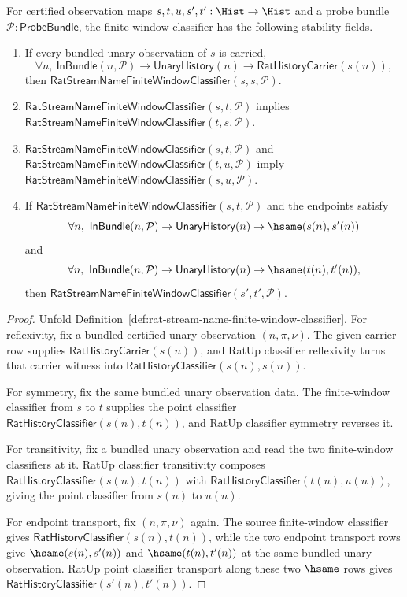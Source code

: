 \begin{theorem}
\label{thm:rat-stream-name-finite-window-stability-fields}
For certified observation maps $s,t,u,s',t':\Hist\to\Hist$ and a probe bundle
$\mathcal{P}:\mathsf{ProbeBundle}$, the finite-window classifier has the
following stability fields.
\begin{enumerate}
  \item If every bundled unary observation of $s$ is carried,
  $$
  \forall n,\ \mathsf{InBundle}(n,\mathcal{P})\to
  \mathsf{UnaryHistory}(n)\to\mathsf{RatHistoryCarrier}(s(n)),
  $$
  then $\mathsf{RatStreamNameFiniteWindowClassifier}(s,s,\mathcal{P})$.
  \item $\mathsf{RatStreamNameFiniteWindowClassifier}(s,t,\mathcal{P})$
  implies
  $\mathsf{RatStreamNameFiniteWindowClassifier}(t,s,\mathcal{P})$.
  \item $\mathsf{RatStreamNameFiniteWindowClassifier}(s,t,\mathcal{P})$ and
  $\mathsf{RatStreamNameFiniteWindowClassifier}(t,u,\mathcal{P})$ imply
  $\mathsf{RatStreamNameFiniteWindowClassifier}(s,u,\mathcal{P})$.
  \item If $\mathsf{RatStreamNameFiniteWindowClassifier}(s,t,\mathcal{P})$
  and the endpoints satisfy
  $$
  \forall n,\ \mathsf{InBundle}(n,\mathcal{P})\to
  \mathsf{UnaryHistory}(n)\to\hsame(s(n),s'(n))
  $$
  and
  $$
  \forall n,\ \mathsf{InBundle}(n,\mathcal{P})\to
  \mathsf{UnaryHistory}(n)\to\hsame(t(n),t'(n)),
  $$
  then $\mathsf{RatStreamNameFiniteWindowClassifier}(s',t',\mathcal{P})$.
\end{enumerate}
\end{theorem}
\begin{proof}
Unfold Definition~\ref{def:rat-stream-name-finite-window-classifier}. For
reflexivity, fix a bundled certified unary observation $(n,\pi,\nu)$. The
given carrier row supplies $\mathsf{RatHistoryCarrier}(s(n))$, and RatUp
classifier reflexivity turns that carrier witness into
$\mathsf{RatHistoryClassifier}(s(n),s(n))$.

For symmetry, fix the same bundled unary observation data. The finite-window
classifier from $s$ to $t$ supplies the point classifier
$\mathsf{RatHistoryClassifier}(s(n),t(n))$, and RatUp classifier symmetry
reverses it.

For transitivity, fix a bundled unary observation and read the two
finite-window classifiers at it. RatUp classifier transitivity composes
$\mathsf{RatHistoryClassifier}(s(n),t(n))$ with
$\mathsf{RatHistoryClassifier}(t(n),u(n))$, giving the point classifier from
$s(n)$ to $u(n)$.

For endpoint transport, fix $(n,\pi,\nu)$ again. The source finite-window
classifier gives $\mathsf{RatHistoryClassifier}(s(n),t(n))$, while the two
endpoint transport rows give $\hsame(s(n),s'(n))$ and $\hsame(t(n),t'(n))$ at
the same bundled unary observation. RatUp point classifier transport along
these two $\hsame$ rows gives
$\mathsf{RatHistoryClassifier}(s'(n),t'(n))$.
\end{proof}

